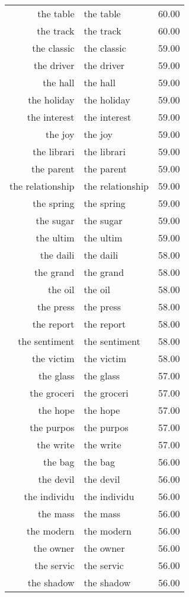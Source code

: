 \begin{table}[ht]
\begin{tabular}{rlr}
  the table & the table & 60.00 \\ 
  the track & the track & 60.00 \\ 
  the classic & the classic & 59.00 \\ 
  the driver & the driver & 59.00 \\ 
  the hall & the hall & 59.00 \\ 
  the holiday & the holiday & 59.00 \\ 
  the interest & the interest & 59.00 \\ 
  the joy & the joy & 59.00 \\ 
  the librari & the librari & 59.00 \\ 
  the parent & the parent & 59.00 \\ 
  the relationship & the relationship & 59.00 \\ 
  the spring & the spring & 59.00 \\ 
  the sugar & the sugar & 59.00 \\ 
  the ultim & the ultim & 59.00 \\ 
  the daili & the daili & 58.00 \\ 
  the grand & the grand & 58.00 \\ 
  the oil & the oil & 58.00 \\ 
  the press & the press & 58.00 \\ 
  the report & the report & 58.00 \\ 
  the sentiment & the sentiment & 58.00 \\ 
  the victim & the victim & 58.00 \\ 
  the glass & the glass & 57.00 \\ 
  the groceri & the groceri & 57.00 \\ 
  the hope & the hope & 57.00 \\ 
  the purpos & the purpos & 57.00 \\ 
  the write & the write & 57.00 \\ 
  the bag & the bag & 56.00 \\ 
  the devil & the devil & 56.00 \\ 
  the individu & the individu & 56.00 \\ 
  the mass & the mass & 56.00 \\ 
  the modern & the modern & 56.00 \\ 
  the owner & the owner & 56.00 \\ 
  the servic & the servic & 56.00 \\ 
  the shadow & the shadow & 56.00 \\ 

\end{tabular}
\end{table}
